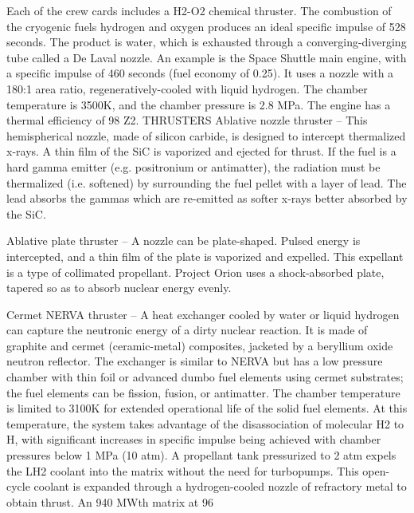 \documentclass[a4paper]{book}
\begin{document}
Each of  the crew cards includes a H2-O2 chemical thruster.  The combustion of the cryogenic fuels hydrogen and oxygen produces an ideal specific impulse of 528 seconds. The product is water, which is exhausted through a converging-diverging tube called a De Laval nozzle. An example is the Space Shuttle main engine, with a specific impulse of 460 seconds (fuel economy of 0.25). It uses a nozzle with a 180:1 area ratio, regeneratively-cooled with liquid hydrogen.  The chamber temperature is 3500K, and the chamber pressure is 2.8 MPa.  The engine has a thermal efficiency of 98%
Z2. THRUSTERS 
Ablative nozzle thruster – This hemispherical nozzle, made of silicon carbide, is designed to intercept thermalized x-rays. A thin film of the SiC is vaporized and ejected for thrust.  If the fuel is a hard gamma emitter (e.g. positronium or antimatter), the radiation must be thermalized (i.e. softened) by surrounding the fuel pellet with a layer of lead. The lead absorbs the gammas which are re-emitted as softer x-rays better absorbed by the SiC.
 
Ablative plate thruster – A nozzle can be plate-shaped.  Pulsed energy is intercepted, and a thin film of the plate is vaporized and expelled.  This expellant is a type of collimated propellant. Project Orion uses a shock-absorbed plate, tapered so as to absorb nuclear energy evenly.  
 
Cermet NERVA thruster – A heat exchanger cooled by water or liquid hydrogen can capture the neutronic energy of a dirty nuclear reaction. It is made of graphite and cermet (ceramic-metal) composites, jacketed by a beryllium oxide neutron reflector. The exchanger is similar to NERVA but has a low pressure chamber with thin foil or advanced dumbo fuel elements using cermet substrates; the fuel elements can be fission, fusion, or antimatter.  The chamber temperature is limited to 3100K for extended operational life of the solid fuel elements.  At this temperature, the system takes advantage of the disassociation of molecular H2 to H, with significant increases in specific impulse being achieved with chamber pressures below 1 MPa (10 atm). A propellant tank pressurized to 2 atm expels the LH2 coolant into the matrix without the need for turbopumps.  This open-cycle coolant is expanded through a hydrogen-cooled nozzle of refractory metal to obtain thrust. An 940 MWth matrix at 96%
 
\end{document}

